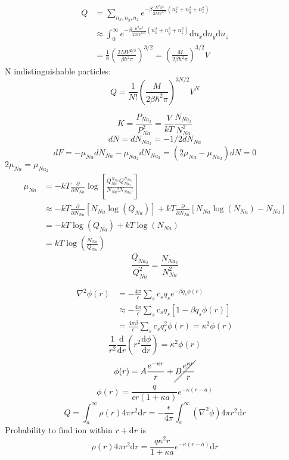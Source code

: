 \documentclass[letterpaper]{article}
\def\d{\mathrm{d}}
\begin{document}
\begin{multicols}{2}
\begin{align*}
Q&=\sum_{n_x,n_y,n_z}e^{-\beta\frac{\hbar^2\pi^2}{2MV^{2/3}}(n_x^2+n_y^2+n_z^2)}\\
&\approx\int_0^\infty e^{-\beta\frac{\hbar^2\pi^2}{2MV^{2/3}}(n_x^2+n_y^2+n_z^2)}
\d n_x\d n_y\d n_z\\
&=\frac{1}{8}\left(\frac{2MV^{2/3}}{\beta\hbar^2\pi}\right)^{3/2}
=\left(\frac{M}{2\beta\hbar^2\pi}\right)^{3/2}V
\end{align*}
N indistinguishable particles:
\[
Q=\frac{1}{N!}\left(\frac{M}{2\beta\hbar^2\pi}\right)^{3N/2}V^N
\]

\[
K=\frac{P_{Na_2}}{P_{Na}^2}=\frac{V}{kT}\frac{N_{Na_2}}{N_{Na}^2}
\]
\[
dN=dN_{Na_2}=-1/2dN_{Na}
\]
\[
dF=-\mu_{Na}dN_{Na}-\mu_{Na_2}dN_{Na_2}=(2\mu_{Na}-\mu_{Na_2})dN=0
\]
$2\mu_{Na}=\mu_{Na_2}$
\begin{align*}
\mu_{Na}&=-kT\frac{\partial}{\partial
N_{Na}}\log\left[\frac{Q_{Na}^{N_{Na}}Q_{Na_2}^{N_{Na_2}}}{N_{Na}!N_{Na_2}!}
\right]\\
&\approx-kT\frac{\partial}{\partial N_{Na}}[N_{Na}\log(Q_{Na})]
+kT\frac{\partial}{\partial N_{Na}}[N_{Na}\log(N_{Na})-N_{Na}]\\
&=-kT\log(Q_{Na})+kT\log(N_{Na})\\
&=kT\log\left(\frac{N_{Na}}{Q_{Na}}\right)
\end{align*}
\[
\frac{Q_{Na_2}}{Q_{Na}^2}=\frac{N_{Na_2}}{N_{Na}^2}
\]

\begin{align*}
\nabla^2\phi(r)&=-\frac{4\pi}{\epsilon}\sum_sc_sq_se^{-\beta q_s\phi(r)}\\
&\approx-\frac{4\pi}{\epsilon}\sum_sc_sq_s[1-\beta q_s\phi(r)]\\
&=\frac{4\pi\beta}{\epsilon}\sum_sc_sq_s^2\phi(r)=\kappa^2\phi(r)
\end{align*}
\[
\frac{1}{r^2}\frac{\d}{\d r}\left(r^2\frac{\d\phi}{\d r}\right)=\kappa^2\phi(r)
\]
\[
\phi(r)=A\frac{e^{-\kappa r}}{r}+\cancel{B\frac{e^{\kappa r}}{r}}
\]
\[
\phi(r)=\frac{q}{\epsilon r(1+\kappa a)}e^{-\kappa(r-a)}
\]
\[
Q=\int_a^\infty\rho(r)4\pi r^2\d r
=-\frac{\epsilon}{4\pi}\int_a^\infty(\nabla^2\phi)4\pi r^2\d r
\]
Probability to find ion within $r+\d r$ is
\[
\rho(r)4\pi r^2\d r=\frac{q\kappa^2r}{1+\kappa a}e^{-\kappa(r-a)}\d r
\]


\end{multicols}
\end{document}

